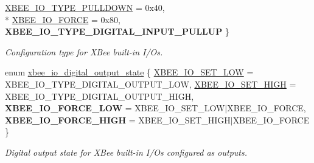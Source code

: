 \begin{DoxyCompactItemize}
\hyperlink{group__xbee__io_ggac23a55c53310f865d9ed2381e331a438a74522e6465b22217ea88fec09cf6601c}{X\-B\-E\-E\-\_\-\-I\-O\-\_\-\-T\-Y\-P\-E\-\_\-\-P\-U\-L\-L\-D\-O\-W\-N} = 0x40, 
\\*
\hyperlink{group__xbee__io_ggac23a55c53310f865d9ed2381e331a438a4566a81606cd9dbd9ec84207a02a5936}{X\-B\-E\-E\-\_\-\-I\-O\-\_\-\-F\-O\-R\-C\-E} = 0x80, 
{\bfseries X\-B\-E\-E\-\_\-\-I\-O\-\_\-\-T\-Y\-P\-E\-\_\-\-D\-I\-G\-I\-T\-A\-L\-\_\-\-I\-N\-P\-U\-T\-\_\-\-P\-U\-L\-L\-U\-P}
 \}
\begin{DoxyCompactList}\small\item\em Configuration type for X\-Bee built-\/in I/\-Os. \end{DoxyCompactList}\item 
enum \hyperlink{group__xbee__io_gaf104a10d2bc34550b99de92fe3564cd2}{xbee\-\_\-io\-\_\-digital\-\_\-output\-\_\-state} \{ \hyperlink{group__xbee__io_ggaf104a10d2bc34550b99de92fe3564cd2ab51805fa21200aa69c1b83b718e8a48b}{X\-B\-E\-E\-\_\-\-I\-O\-\_\-\-S\-E\-T\-\_\-\-L\-O\-W} = X\-B\-E\-E\-\_\-\-I\-O\-\_\-\-T\-Y\-P\-E\-\_\-\-D\-I\-G\-I\-T\-A\-L\-\_\-\-O\-U\-T\-P\-U\-T\-\_\-\-L\-O\-W, 
\hyperlink{group__xbee__io_ggaf104a10d2bc34550b99de92fe3564cd2a252b4619d7e663b9b816389c34731bd7}{X\-B\-E\-E\-\_\-\-I\-O\-\_\-\-S\-E\-T\-\_\-\-H\-I\-G\-H} = X\-B\-E\-E\-\_\-\-I\-O\-\_\-\-T\-Y\-P\-E\-\_\-\-D\-I\-G\-I\-T\-A\-L\-\_\-\-O\-U\-T\-P\-U\-T\-\_\-\-H\-I\-G\-H, 
{\bfseries X\-B\-E\-E\-\_\-\-I\-O\-\_\-\-F\-O\-R\-C\-E\-\_\-\-L\-O\-W} = X\-B\-E\-E\-\_\-\-I\-O\-\_\-\-S\-E\-T\-\_\-\-L\-O\-W$|$\-X\-B\-E\-E\-\_\-\-I\-O\-\_\-\-F\-O\-R\-C\-E, 
{\bfseries X\-B\-E\-E\-\_\-\-I\-O\-\_\-\-F\-O\-R\-C\-E\-\_\-\-H\-I\-G\-H} = X\-B\-E\-E\-\_\-\-I\-O\-\_\-\-S\-E\-T\-\_\-\-H\-I\-G\-H$|$\-X\-B\-E\-E\-\_\-\-I\-O\-\_\-\-F\-O\-R\-C\-E
 \}
\begin{DoxyCompactList}\small\item\em Digital output state for X\-Bee built-\/in I/\-Os configured as outputs. \end{DoxyCompactList}\end{DoxyCompactItemize}
